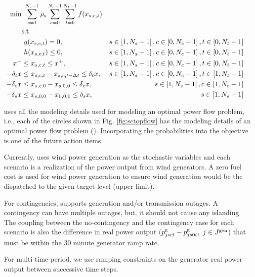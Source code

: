 \begin{align}
\centering
\text{min}&~\sum_{s=1}^{N_s-1}\rho_s\sum_{c=0}^{N_c-1}\sum_{t=0}^{N_t-1}f(x_{s,c,t})&  \label{eq:sctopflow_start}\\
&\text{s.t.}& \nonumber \\
&~g(x_{s,c,t}) = 0,                                        &s \in \left[1,N_s-1\right],c \in \left[0,N_c-1\right], t \in \left[0,N_t-1\right]& \\
&~h(x_{s,c,t}) \le 0,                                      &s \in \left[1,N_s-1\right],c \in \left[0,N_c-1\right], t \in \left[0,N_t-1\right]& \\
x^- & \le x_{s,c,t} \le x^+,                               &s \in \left[1,N_s-1\right],c \in \left[0,N_c-1\right], t\in \left[0,N_t-1\right]& \\
-\delta_t{x} & \le x_{s,c,t} - x_{s,c,t-\Delta{t}} \le \delta_t{x},&s \in \left[1,N_s-1\right],c \in \left[0,N_c-1\right], t \in \left[1,N_t-1\right]& \label{eq:sctopflow_time_coupling}\\
-\delta_c{x} & \le x_{s,c,0} - x_{s,0,0} \le \delta_c{x},&s \in \left[1,N_s-1\right],c \in \left[1,N_c-1\right]&
\label{eq:sctopflow_contingency_coupling} \\
-\delta_s{x} & \le x_{s,0,0} - x_{0,0,0} \le \delta_s{x},&s \in \left[1,N_s-1\right]&
\label{eq:sctopflow_end}
\end{align}

{\sopflow} uses all the modeling details used for modeling an optimal power flow problem, i.e., each of the circles shown in Fig. \ref{fig:sctopflow} has the modeling details of an optimal power flow problem (\opflow). Incorporating the probabilities into the objective is one of the future action items. 

Currently, \sopflow uses wind power generation as the stochastic variables and each scenario is a realization of the power output from wind generators. A zero fuel cost is used for wind power generation to ensure wind generation would be the dispatched to the given target level (upper limit). 

For contingencies, \sopflow supports generation and/or transmission outages. A contingency can have multiple outages, but, it should not cause any islanding. The coupling between the no-contingency and the contingency case for each scenario is also the difference in real power output ($p_{jsct}^{\text{g}} - p_{js0t}^{\text{g}},~ j \in J^\text{gen}$) that must be within the 30 minute generator ramp rate.

For multi time-period, we use ramping constraints on the generator real power output between successive time steps.


